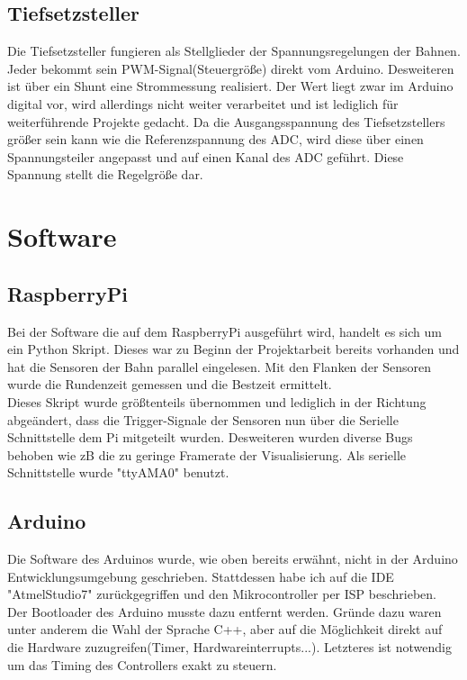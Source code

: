 \documentclass[a4paper, 11pt]{scrartcl}
\begin{document}
	\subsection{Tiefsetzsteller}
		Die Tiefsetzsteller fungieren als Stellglieder der Spannungsregelungen der Bahnen.
		Jeder bekommt sein PWM-Signal(Steuergröße) direkt vom Arduino. Desweiteren ist über ein Shunt eine
		Strommessung realisiert. Der Wert liegt zwar im Arduino digital vor, wird allerdings nicht weiter
		verarbeitet und ist lediglich für weiterführende Projekte gedacht. Da die Ausgangsspannung des
		Tiefsetzstellers größer sein kann wie die Referenzspannung des ADC,
		wird diese über einen Spannungsteiler angepasst und auf einen Kanal des ADC geführt.
		Diese Spannung stellt die Regelgröße dar.
	\newpage

\section{Software}
	\subsection{RaspberryPi}

		Bei der Software die auf dem RaspberryPi ausgeführt wird, handelt es sich um ein Python Skript.
		Dieses war zu Beginn der Projektarbeit bereits vorhanden und hat die Sensoren
		der Bahn parallel eingelesen. Mit den Flanken der Sensoren wurde die Rundenzeit gemessen
		und die Bestzeit ermittelt.\\
		Dieses Skript wurde größtenteils übernommen und lediglich in der Richtung abgeändert,
		dass die Trigger-Signale der Sensoren nun über die Serielle Schnittstelle dem Pi mitgeteilt wurden.
		Desweiteren wurden diverse Bugs behoben wie zB die zu geringe Framerate der Visualisierung.
		Als serielle Schnittstelle wurde "ttyAMA0" benutzt.
		\newpage
	\subsection{Arduino}
		Die Software des Arduinos wurde, wie oben bereits erwähnt, nicht in der Arduino Entwicklungsumgebung
		geschrieben. Stattdessen habe ich auf die IDE "AtmelStudio7" zurückgegriffen und den Mikrocontroller
		per ISP beschrieben. Der Bootloader des Arduino musste dazu entfernt werden.
		Gründe dazu waren unter anderem die Wahl der Sprache C++,
		aber auf die Möglichkeit direkt auf die Hardware zuzugreifen(Timer, Hardwareinterrupts...).
		Letzteres ist notwendig um das Timing des Controllers exakt zu steuern.\\
\end{document}
